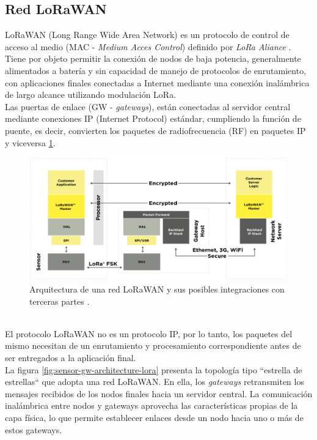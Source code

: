 \subsection{Red LoRaWAN}
LoRaWAN (Long Range Wide Area Network) es un protocolo de control de acceso al medio (MAC - \textit{Medium Acces Control}) definido por \textit{LoRa Aliance} \citep{lora_alliance}. Tiene por objeto permitir la conexión de nodos de baja potencia, generalmente alimentados a batería y sin capacidad de manejo de protocolos de enrutamiento, con aplicaciones finales conectadas a Internet mediante una conexión inalámbrica de largo alcance utilizando modulación LoRa.\\
Las puertas de enlace (GW - \textit{gateways}), están conectadas al servidor central mediante conexiones IP (Internet Protocol) estándar, cumpliendo la función de puente, es decir, convierten los paquetes de radiofrecuencia (RF) en paquetes IP y viceversa \ref{fig:arqlorawan}.\\
\begin{figure}[h!]
	\centering
	\includegraphics[width=1.05\linewidth]{Figures/arq_lorawan_2}
	\caption{Arquitectura de una red LoRaWAN y sus posibles integraciones con terceras partes \citep{lora_alliance}.}
	\label{fig:arqlorawan}
\end{figure}\\
El protocolo LoRaWAN no es un protocolo IP, por lo tanto, los paquetes del mismo necesitan de un enrutamiento y procesamiento correspondiente antes de ser entregados a la aplicación final.\\
La figura \ref{fig:sensor-gw-architecture-lora} presenta la topología tipo ``estrella de estrellas`` que adopta una red LoRaWAN. En ella, los \textit{gateways} retransmiten los mensajes recibidos de los nodos finales hacia un servidor central. La comunicación inalámbrica entre nodos y gateways aprovecha las características propias de la capa física, lo que permite establecer enlaces desde un nodo hacia uno o más de estos gateways.\\
